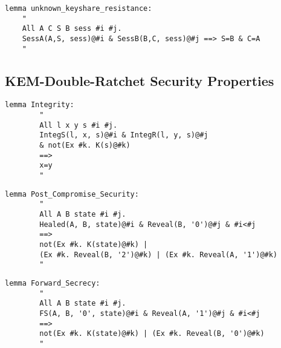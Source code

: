 \begin{Verbatim}
lemma unknown_keyshare_resistance:
    "
    All A C S B sess #i #j.
    SessA(A,S, sess)@#i & SessB(B,C, sess)@#j ==> S=B & C=A
    "
\end{Verbatim}

\subsection{KEM-Double-Ratchet Security Properties}

\begin{Verbatim}
lemma Integrity:
	    "
	    All l x y s #i #j.
	    IntegS(l, x, s)@#i & IntegR(l, y, s)@#j 
	    & not(Ex #k. K(s)@#k)
	    ==>
	    x=y
	    " 
\end{Verbatim}

\begin{Verbatim}
lemma Post_Compromise_Security:
    	"
    	All A B state #i #j.
	    Healed(A, B, state)@#i & Reveal(B, '0')@#j & #i<#j 
	    ==> 
	    not(Ex #k. K(state)@#k) | 
	    (Ex #k. Reveal(B, '2')@#k) | (Ex #k. Reveal(A, '1')@#k)
	    "
\end{Verbatim}

\begin{Verbatim}
lemma Forward_Secrecy:
	    "
	    All A B state #i #j. 
	    FS(A, B, '0', state)@#i & Reveal(A, '1')@#j & #i<#j     
	    ==>     
	    not(Ex #k. K(state)@#k) | (Ex #k. Reveal(B, '0')@#k)
    	"
\end{Verbatim}






